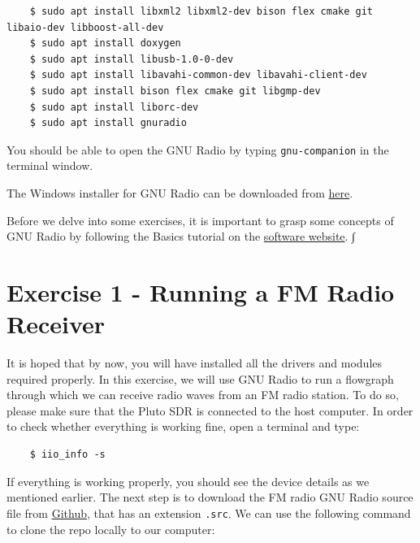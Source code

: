 \documentclass[11pt]{article}
\begin{document}
\begin{mdframed}[backgroundcolor=gray!20]
  \tiny
  \begin{verbatim}
    $ sudo apt install libxml2 libxml2-dev bison flex cmake git libaio-dev libboost-all-dev
    $ sudo apt install doxygen
    $ sudo apt install libusb-1.0-0-dev
    $ sudo apt install libavahi-common-dev libavahi-client-dev
    $ sudo apt install bison flex cmake git libgmp-dev
    $ sudo apt install liborc-dev
    $ sudo apt install gnuradio
  \end{verbatim}
\end{mdframed}

You should be able to open the GNU Radio by typing \texttt{gnu-companion} in the terminal window. 

\begin{tcolorbox}[colback=blue!5]
  The Windows installer for GNU Radio can be downloaded from \href{http://www.gcndevelopment.com/gnuradio/index.htm}{here}. 
\end{tcolorbox}

Before we delve into some exercises, it is important to grasp some concepts of GNU Radio by following the Basics tutorial on the \href{https://wiki.gnuradio.org/index.php/TutorialsCoreConcepts}{software website}. ∫

\section{Exercise 1 - Running a FM Radio Receiver}

It is hoped that by now, you will have installed all the drivers and modules required properly. In this exercise, we will use GNU Radio to run a flowgraph through which we can receive radio waves from an FM radio station. To do so, please make sure that the Pluto SDR is connected to the host computer. In order to check whether everything is working fine, open a terminal and type:

\begin{mdframed}[backgroundcolor=gray!20]
  \tiny
  \begin{verbatim}
    $ iio_info -s
  \end{verbatim}
\end{mdframed}
 
If everything is working properly, you should see the device details as we mentioned earlier. The next step is to download the FM radio GNU Radio source file from \href{https://github.com/hasantahir/GNU-Radio-Exercises}{Github}, that has an extension \texttt{.src}. We can use the following command to clone the repo locally to our computer:
\end{document}
